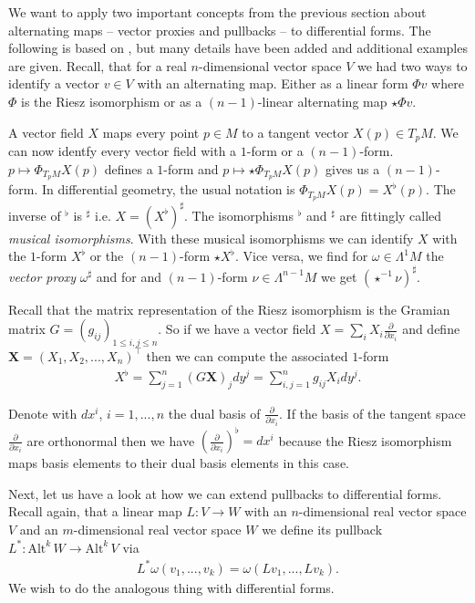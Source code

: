 \documentclass[12pt,a4paper]{article}
\numberwithin{equation}{subsection}
\numberwithin{lemma}{subsection}
\theoremstyle{definition}
\newcommand{\alternating}[2]{ {\text{Alt}^{#1}\,#2} }
\begin{document}
We want to apply two important concepts from the previous section about 
alternating maps -- vector proxies and pullbacks -- to differential forms.
The following is based on \cite[Ch.\,6]{arnold}, 
but many details have been
added and additional examples are given.
Recall, that for a real $n$-dimensional vector space $V$ we had two 
ways to identify a vector $v\in V$ with an alternating map. Either as a 
linear form $\Phi v$ where $\Phi$ is the Riesz isomorphism or as a 
$(n-1)$-linear alternating map $\star \Phi v$. 

A vector field $X$ maps every point $p \in M$ to a tangent vector 
$X(p) \in T_p M$. We can now identfy every vector field with a $1$-form or 
a $(n-1)$-form. $p \mapsto \Phi_{T_p M} X(p)$ defines a $1$-form and  
$p \mapsto \star \Phi_{T_p M} X(p)$ gives us a $(n-1)$-form. In differential 
geometry, the usual notation is
$\Phi_{T_p M} X(p) = X^\flat(p)$. The inverse of $^\flat$ is $^\sharp$ i.e. 
$X = (X^\flat)^\sharp$.
The isomorphisms $^\flat$ and $^\sharp$ 
are fittingly called \textit{musical isomorphisms}. 
With these musical isomorphisms we can identify $X$ with the $1$-form 
$X^\flat$ or the $(n-1)$-form $\star X^\flat$. Vice versa, we find 
for $\omega \in \Lambda^1 M$ the \textit{vector proxy} $\omega ^\sharp$ and for 
and $(n-1)$-form $\nu \in \Lambda^{n-1} M$ we get $(\star^{-1} \nu)^\sharp$.

Recall that the matrix representation of the Riesz isomorphism is the 
Gramian matrix $G = (g_{ij})_{1\leq i,j \leq n} $. So if we have a vector field 
$X = \sum_i X_i \frac{\partial}{\partial x_i}$ and define 
$\mathbf{X} = (X_1, X_2, ..., X_n)^\top$ then we can compute the 
associated $1$-form 
\begin{align*}
    X^\flat = \sum_{j=1}^n (G \mathbf{X})_j dy^j 
    = \sum_{i,j=1}^n g_{ij} X_i dy^j.
\end{align*}

Denote with $dx^i$, $i=1, ..., n$ the dual basis of 
$\frac{\partial}{\partial x_i}$.
If the basis of the tangent space $\frac{\partial}{\partial x_i}$ are 
orthonormal then we have $(\frac{\partial}{\partial x_i})^\flat = dx^i$ 
because the Riesz isomorphism maps basis elements to their dual basis elements
in this case.

Next, let us have a look at how we can extend pullbacks to differential forms.
Recall again, that a linear map $L: V \rightarrow W$ with an 
$n$-dimensional real vector space $V$ and an 
$m$-dimensional real vector space $W$ we define its pullback 
$L^*: \alternating{k}{W} \rightarrow \alternating{k}{V}$ via 
\begin{align*}
    L^*\omega (v_1, ..., v_k) = \omega (Lv_1, ..., L v_k).
\end{align*} 
We wish to do the analogous thing with differential forms. 
\end{document}

